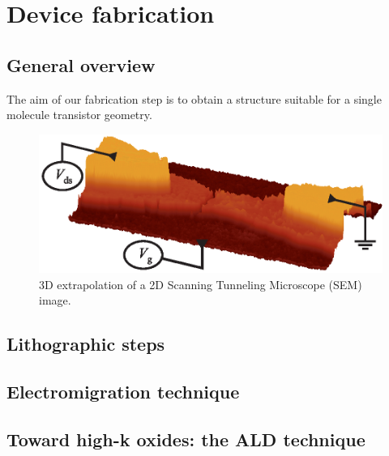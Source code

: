 \chapter{Device fabrication}

\section{General overview}
The aim of our fabrication step is to obtain a structure suitable for a single molecule transistor geometry.
\begin{figure}[h]
  \begin{center}
    \includegraphics{fabrication_chapter/figs/SMT.eps}
  \end{center}
  \caption{3D extrapolation of a 2D Scanning Tunneling Microscope (SEM) image.}
  \label{fig:SMT_picture}
\end{figure}

\section{Lithographic steps}
\section{Electromigration technique}
\section{Toward high-k oxides: the ALD technique}

